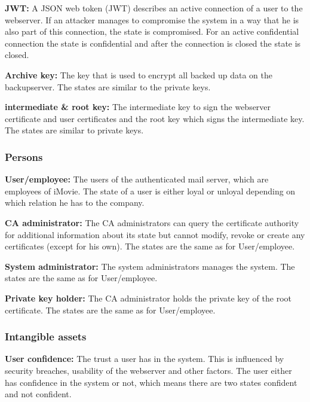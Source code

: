 \documentclass[english]{article}
\begin{document}
\begin{description}
		\item{\textbf{JWT:}} A JSON web token (JWT) describes an active connection of a user to the webserver. If an attacker manages to compromise the system in a way that he is also part of this connection, the state is compromised. For an active confidential connection the state is confidential and after the connection is closed the state is closed.
		\item{\textbf{Archive key:}} The key that is used to encrypt all backed up data on the backupserver. The states are similar to the private keys.
		\item{\textbf{intermediate \& root key:}} The intermediate key to sign the webserver certificate and user certificates and the root key which signs the intermediate key. The states are similar to private keys.
	\end{description}

\subsubsection{Persons}
\begin{description}
\item{\textbf{User/employee:}} The users of the authenticated mail server, which are employees of iMovie. The state of a user is either loyal or unloyal depending on which relation he has to the company.
\item{\textbf{CA administrator:}} The CA administrators can query the certificate authority for additional information about its state but cannot modify, revoke or create any certificates (except for his own). The states are the same as for User/employee.
  \item{\textbf{System administrator:}} The system administrators manages the system. The states are the same as for User/employee.
  \item{\textbf{Private key holder:}} The CA administrator holds the private key of the root certificate. The states are the same as for User/employee.
\end{description}


\subsubsection{Intangible assets}
\begin{description}
\item{\textbf{User confidence:}} The trust a user has in the system. This is influenced by security breaches, usability of the webserver and other factors. The user either has confidence in the system or not, which means there are two states confident and not confident.
  \end{description}
\end{document}
